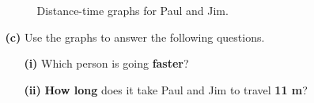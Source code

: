 \documentclass[A4,12pt]{article}
\begin{document}
\begin{enumerate}[label=\bfseries (\arabic*)]
\begin{itemize}
\begin{figure}[H]
\begin{tikzpicture}
\end{tikzpicture}
    \caption{Distance-time graphs for Paul and Jim.}
\end{figure}
    \item[\bf (c)] Use the graphs to answer the following questions.
    \begin{itemize}
        \item[\bf (i)] Which person is going \textbf{faster}?
        \item[\bf (ii)] \textbf{How long} does it take Paul and Jim to travel \textbf{11 m}?

\end{itemize}
\end{itemize}
\end{enumerate}
\end{document}

